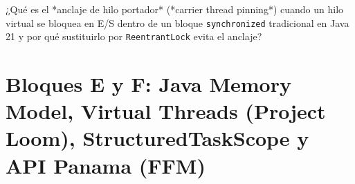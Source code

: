 \documentclass{book}
\begin{document}
\begin{tcolorbox}[title={Autoficha}, studiumcheck, breakable]

¿Qué es el *anclaje de hilo portador* (*carrier thread pinning*) cuando un hilo virtual se bloquea en E/S dentro de un bloque \texttt{synchronized} tradicional en Java 21 y por qué sustituirlo por \texttt{ReentrantLock} evita el anclaje?
\end{tcolorbox}

\section{Bloques E y F: Java Memory Model, Virtual Threads (Project Loom), StructuredTaskScope y API Panama (FFM)}
\end{document}
